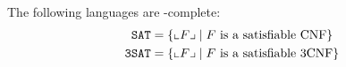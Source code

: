 \begin{theorem} 
    The following languages are \NP-complete:
    \[
        \begin{split}
            \texttt{SAT}  &= \{ {\llcorner{F}\lrcorner} \mid F \text{ is a satisfiable CNF} \} \\
            \texttt{3SAT} &= \{ {\llcorner{F}\lrcorner} \mid F \text{ is a satisfiable 3CNF} \} \\
        \end{split}  
    \]
\end{theorem}
